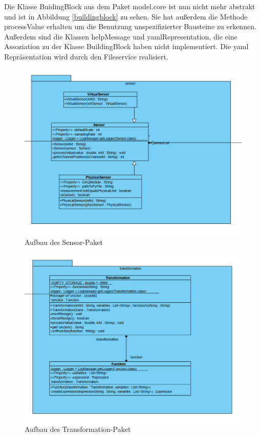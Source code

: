 \documentclass[parskip=full]{scrartcl}
\begin{document}
Die Klasse BuidingBlock aus dem Paket model.core ist nun nicht mehr abstrakt und ist in Abbildung \ref{buildingblock} zu sehen. Sie hat außerdem die Methode processValue erhalten um die Benutzung unspezifizierter Bausteine zu erkennen. Außerdem sind die Klassen helpMessage und yamlRepresentation, die eine Assoziation zu der Klasse BuildingBlock haben nicht implementiert. Die yaml Repräsentation wird durch den Fileservice realisiert.

\begin{figure}[htbp]
	\begin{center}
		\includegraphics[width = 16cm]{Grafiken/sensor.PNG}
		\caption{Aufbau des Sensor-Paket}
		\label{sensor}
	\end{center}
\end{figure}

\begin{figure}[htbp]
	\begin{center}
		\includegraphics[width = 16cm]{Grafiken/trans.PNG}
		\caption{Aufbau des Transformation-Paket}
		\label{trans}
	\end{center}
\end{figure}
\end{document}
